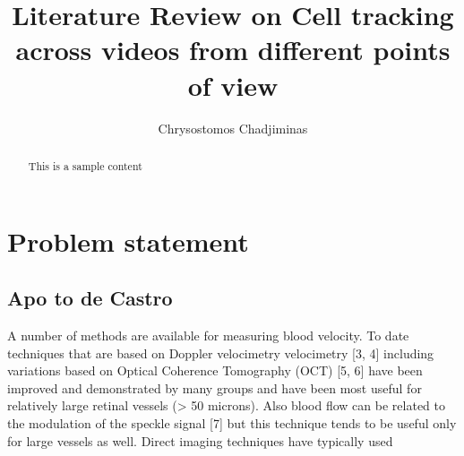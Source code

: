 \documentclass[]{article}
\title{Literature Review on Cell tracking across videos from different points of view}
\author{Chrysostomos Chadjiminas}
\begin{document}
\maketitle

\begin{abstract}
	This is a sample content
\end{abstract}


\section{Problem statement}

\subsection{Apo to de Castro}

A number of methods are available for measuring blood velocity. To date techniques that are based on Doppler velocimetry velocimetry [3, 4] including variations based on Optical Coherence Tomography (OCT) [5, 6] have been improved and demonstrated by many groups and have been most useful for relatively large retinal vessels (> 50 microns). Also blood flow can be related to the modulation of the speckle signal [7] but this technique tends to be useful only for large vessels as well. Direct imaging techniques have typically used 
\end{document}
